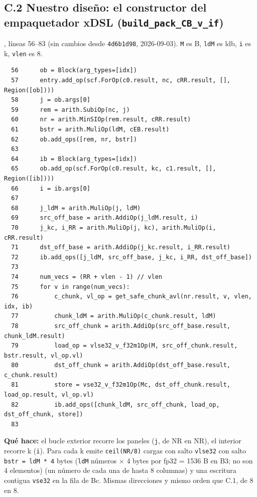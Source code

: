 \documentclass[10pt,a4paper]{article}
\begin{document}
\subsection*{C.2 Nuestro diseño: el constructor del empaquetador xDSL (\texttt{build\_pack\_CB\_v\_if})}
, líneas 56--83 (sin cambios desde \texttt{4d6b1d98}, 2026-09-03). \texttt{M} es B,
\texttt{ldM} es ldb, \texttt{i} es k, \texttt{vlen} es 8.
{\scriptsize\begin{verbatim}
  56      ob = Block(arg_types=[idx])
  57      entry.add_op(scf.ForOp(c0.result, nc, cRR.result, [], Region([ob])))
  58      j = ob.args[0]
  59      rem = arith.SubiOp(nc, j)
  60      nr = arith.MinSIOp(rem.result, cRR.result)
  61      bstr = arith.MuliOp(ldM, cEB.result)
  62      ob.add_ops([rem, nr, bstr])
  63  
  64      ib = Block(arg_types=[idx])
  65      ob.add_op(scf.ForOp(c0.result, kc, c1.result, [], Region([ib])))
  66      i = ib.args[0]
  67  
  68      j_ldM = arith.MuliOp(j, ldM)
  69      src_off_base = arith.AddiOp(j_ldM.result, i)
  70      j_kc, i_RR = arith.MuliOp(j, kc), arith.MuliOp(i, cRR.result)
  71      dst_off_base = arith.AddiOp(j_kc.result, i_RR.result)
  72      ib.add_ops([j_ldM, src_off_base, j_kc, i_RR, dst_off_base])
  73  
  74      num_vecs = (RR + vlen - 1) // vlen
  75      for v in range(num_vecs):
  76          c_chunk, vl_op = get_safe_chunk_avl(nr.result, v, vlen, idx, ib)
  77          chunk_ldM = arith.MuliOp(c_chunk.result, ldM)
  78          src_off_chunk = arith.AddiOp(src_off_base.result, chunk_ldM.result)
  79          load_op = vlse32_v_f32m1Op(M, src_off_chunk.result, bstr.result, vl_op.vl)
  80          dst_off_chunk = arith.AddiOp(dst_off_base.result, c_chunk.result)
  81          store = vse32_v_f32m1Op(Mc, dst_off_chunk.result, load_op.result, vl_op.vl)
  82          ib.add_ops([chunk_ldM, src_off_chunk, load_op, dst_off_chunk, store])
  83  
\end{verbatim}}

\textbf{Qué hace:} el bucle exterior recorre los paneles (\texttt{j}, de NR en NR), el interior recorre k (\texttt{i}). Para cada k
emite \texttt{ceil(NR/8)} cargas con salto \texttt{vlse32} con salto \texttt{bstr = ldM * 4} bytes (\texttt{ldM} números $\times$ 4
bytes por fp32 = 1536 B en B3; no son 4 elementos) (un número de cada una de hasta 8 columnas) y una escritura contigua \texttt{vse32}
en la fila de Bc. Mismas direcciones y mismo orden que C.1, de 8 en 8.
\end{document}
